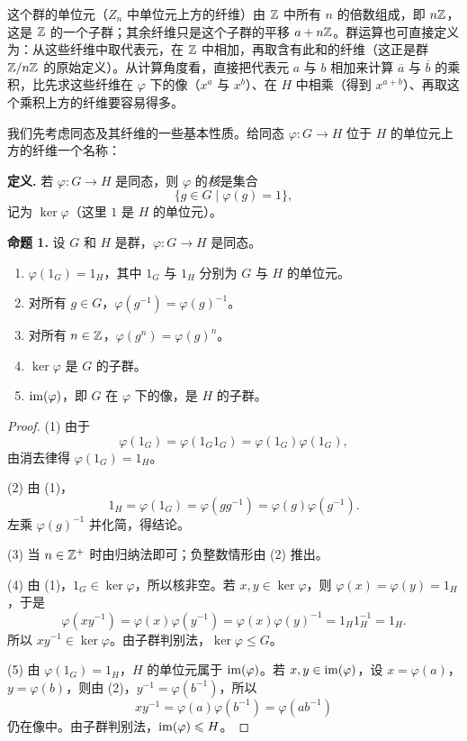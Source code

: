 这个群的单位元（$Z_n$ 中单位元上方的纤维）由 $\mathbb{Z}$ 中所有 $n$ 的倍数组成，即 $n\mathbb{Z}$，这是 $\mathbb{Z}$ 的一个子群；其余纤维只是这个子群的平移 $a+n\mathbb{Z}$。群运算也可直接定义为：从这些纤维中取代表元，在 $\mathbb{Z}$ 中相加，再取含有此和的纤维（这正是群 $\mathbb{Z}/n\mathbb{Z}$ 的原始定义）。从计算角度看，直接把代表元 $a$ 与 $b$ 相加来计算 $\overline a$ 与 $\overline b$ 的乘积，比先求这些纤维在 $\varphi$ 下的像（$x^a$ 与 $x^b$）、在 $H$ 中相乘（得到 $x^{a+b}$）、再取这个乘积上方的纤维要容易得多。

我们先考虑同态及其纤维的一些基本性质。给同态 $\varphi:G\to H$ 位于 $H$ 的单位元上方的纤维一个名称：

\noindent\textbf{定义.} 若 $\varphi:G\to H$ 是同态，则 $\varphi$ 的\emph{核}是集合
\[
  \{g\in G\mid \varphi(g)=1\},
\]
记为 $\ker\varphi$（这里 $1$ 是 $H$ 的单位元）。

\medskip
\noindent\textbf{命题 1.} 设 $G$ 和 $H$ 是群，$\varphi:G\to H$ 是同态。
\begin{enumerate}[label=(\arabic*)]
  \item $\varphi(1_G)=1_H$，其中 $1_G$ 与 $1_H$ 分别为 $G$ 与 $H$ 的单位元。
  \item 对所有 $g\in G$，$\varphi(g^{-1})=\varphi(g)^{-1}$。
  \item 对所有 $n\in\mathbb{Z}$，$\varphi(g^n)=\varphi(g)^n$。
  \item $\ker\varphi$ 是 $G$ 的子群。
  \item $\operatorname{im}(\varphi)$，即 $G$ 在 $\varphi$ 下的像，是 $H$ 的子群。
\end{enumerate}

\begin{proof}
(1) 由于
\[
  \varphi(1_G)=\varphi(1_G1_G)=\varphi(1_G)\varphi(1_G),
\]
由消去律得 $\varphi(1_G)=1_H$。

(2) 由 (1)，
\[
  1_H=\varphi(1_G)=\varphi(gg^{-1})=\varphi(g)\varphi(g^{-1}).
\]
左乘 $\varphi(g)^{-1}$ 并化简，得结论。

(3) 当 $n\in\mathbb{Z}^+$ 时由归纳法即可；负整数情形由 (2) 推出。

(4) 由 (1)，$1_G\in\ker\varphi$，所以核非空。若 $x,y\in\ker\varphi$，则 $\varphi(x)=\varphi(y)=1_H$，于是
\[
  \varphi(xy^{-1})=\varphi(x)\varphi(y^{-1})
  =\varphi(x)\varphi(y)^{-1}=1_H1_H^{-1}=1_H.
\]
所以 $xy^{-1}\in\ker\varphi$。由子群判别法，$\ker\varphi\leq G$。

(5) 由 $\varphi(1_G)=1_H$，$H$ 的单位元属于 $\operatorname{im}(\varphi)$。若 $x,y\in\operatorname{im}(\varphi)$，设 $x=\varphi(a)$，$y=\varphi(b)$，则由 (2)，$y^{-1}=\varphi(b^{-1})$，所以
\[
  xy^{-1}=\varphi(a)\varphi(b^{-1})=\varphi(ab^{-1})
\]
仍在像中。由子群判别法，$\operatorname{im}(\varphi)\leqslant H$。
\end{proof}

